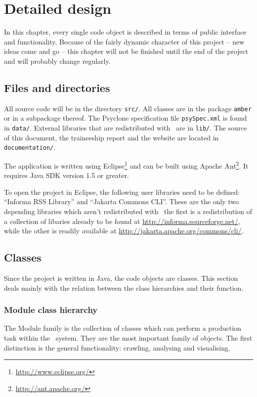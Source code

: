 \chapter{Detailed design}

In this chapter, every single code object is described in terms of public
interface and functionality. Because of the fairly dynamic character of this
project -- new ideas come and go -- this chapter will not be finished until the
end of the project and will probably change regularly.

\section{Files and directories}

All source code will be in the directory \texttt{src/}. All classes are in the
package \texttt{amber} or in a subpackage thereof. The Psyclone specification
file \texttt{psySpec.xml} is found in \texttt{data/}. External libraries that
are redistributed with \Amber\ are in \texttt{lib/}. The source of this
document, the traineeship report and the website are located in
\texttt{documentation/}.

The application is written using
Eclipse\footnote{\url{http://www.eclipse.org/}} and can be built using Apache
Ant\footnote{\url{http://ant.apache.org/}}. It requires Java SDK version 1.5 or
greater.

To open the project in Eclipse, the following user libraries need to be
defined: ``Informa RSS Library'' and ``Jakarta Commons CLI''. These are the
only two depending libraries which aren't redistributed with \Amber\, the first
is a redistribution of a collection of libaries already to be found at
\url{http://informa.sourceforge.net/}, while the other is readily available at
\url{http://jakarta.apache.org/commons/cli/}.

\section{Classes}

Since the project is written in Java, the code objects are classes. This
section deals mainly with the relation between the class hierarchies and their
function.

\subsection{Module class hierarchy}

The Module family is the collection of classes which can perform a production
task within the \Amber\ system. They are the most important family of objects.
The first distinction is the general functionality: crawling, analysing and
visualising.

